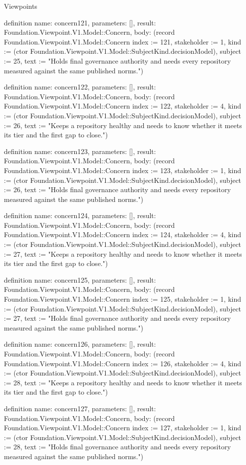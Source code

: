 \begin{lexlean}{Viewpoints}
\begin{semanticmodule}
definition{
  name: concern121,
  parameters: [],
  result: Foundation.Viewpoint.V1.Model::Concern,
  body: (record Foundation.Viewpoint.V1.Model::Concern {index := 121, stakeholder := 1, kind := (ctor Foundation.Viewpoint.V1.Model::SubjectKind.decisionModel), subject := 25, text := "Holds final governance authority and needs every repository measured against the same published norms."})
}

definition{
  name: concern122,
  parameters: [],
  result: Foundation.Viewpoint.V1.Model::Concern,
  body: (record Foundation.Viewpoint.V1.Model::Concern {index := 122, stakeholder := 4, kind := (ctor Foundation.Viewpoint.V1.Model::SubjectKind.decisionModel), subject := 26, text := "Keeps a repository healthy and needs to know whether it meets its tier and the first gap to close."})
}

definition{
  name: concern123,
  parameters: [],
  result: Foundation.Viewpoint.V1.Model::Concern,
  body: (record Foundation.Viewpoint.V1.Model::Concern {index := 123, stakeholder := 1, kind := (ctor Foundation.Viewpoint.V1.Model::SubjectKind.decisionModel), subject := 26, text := "Holds final governance authority and needs every repository measured against the same published norms."})
}

definition{
  name: concern124,
  parameters: [],
  result: Foundation.Viewpoint.V1.Model::Concern,
  body: (record Foundation.Viewpoint.V1.Model::Concern {index := 124, stakeholder := 4, kind := (ctor Foundation.Viewpoint.V1.Model::SubjectKind.decisionModel), subject := 27, text := "Keeps a repository healthy and needs to know whether it meets its tier and the first gap to close."})
}

definition{
  name: concern125,
  parameters: [],
  result: Foundation.Viewpoint.V1.Model::Concern,
  body: (record Foundation.Viewpoint.V1.Model::Concern {index := 125, stakeholder := 1, kind := (ctor Foundation.Viewpoint.V1.Model::SubjectKind.decisionModel), subject := 27, text := "Holds final governance authority and needs every repository measured against the same published norms."})
}

definition{
  name: concern126,
  parameters: [],
  result: Foundation.Viewpoint.V1.Model::Concern,
  body: (record Foundation.Viewpoint.V1.Model::Concern {index := 126, stakeholder := 4, kind := (ctor Foundation.Viewpoint.V1.Model::SubjectKind.decisionModel), subject := 28, text := "Keeps a repository healthy and needs to know whether it meets its tier and the first gap to close."})
}

definition{
  name: concern127,
  parameters: [],
  result: Foundation.Viewpoint.V1.Model::Concern,
  body: (record Foundation.Viewpoint.V1.Model::Concern {index := 127, stakeholder := 1, kind := (ctor Foundation.Viewpoint.V1.Model::SubjectKind.decisionModel), subject := 28, text := "Holds final governance authority and needs every repository measured against the same published norms."})
}


\end{semanticmodule}
\end{lexlean}
